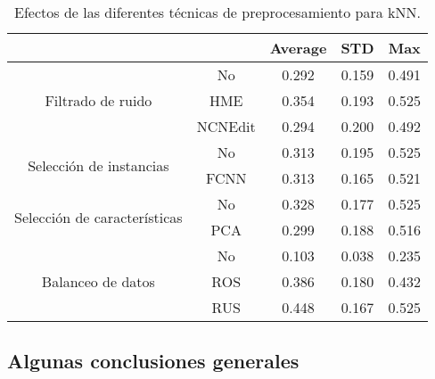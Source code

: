 \begin{table}
    \centering
    \begin{tabular}{cc|c|c|c|}
    \cline{3-5}
    \multicolumn{1}{l}{\textbf{}} & \textbf{} & \multicolumn{1}{c|}{\textbf{Average}} & \multicolumn{1}{c|}{\textbf{STD}} & \textbf{Max} \\ \hline
    \multicolumn{1}{|c|}{\multirow{3}{*}{Filtrado de ruido}}       & No        & 0.292  & 0.159
    & 0.491    \\ \cline{2-5} 
    \multicolumn{1}{|c|}{}  & HME       & 0.354   & 0.193
    & 0.525        \\ \cline{2-5} 
    \multicolumn{1}{|c|}{}  & NCNEdit   & 0.294  & 0.200
    & 0.492        \\ \hline
    \multicolumn{1}{|c|}{\multirow{2}{*}{Selección de instancias}} & No        & 0.313    &  0.195
    & 0.525        \\ \cline{2-5} 
    \multicolumn{1}{|c|}{}  & FCNN      & 0.313   &  0.165
    & 0.521        \\ \hline
    \multicolumn{1}{|c|}{\multirow{2}{*}{Selección de características}} & No        & 0.328    & 0.177
    & 0.525        \\ \cline{2-5} 
    \multicolumn{1}{|c|}{}  & PCA      & 0.299   & 0.188
    & 0.516        \\ \hline
    \multicolumn{1}{|c|}{\multirow{3}{*}{Balanceo de datos}}       & No        & 0.103     &  0.038
    & 0.235        \\ \cline{2-5} 
    \multicolumn{1}{|c|}{}  & ROS       & 0.386  & 0.180
    & 0.432        \\ \cline{2-5} 
    \multicolumn{1}{|c|}{}  & RUS       & 0.448  & 0.167
    & 0.525        \\ \hline
    \end{tabular}
    \caption{Efectos de las diferentes técnicas de preprocesamiento para kNN.}
    \label{knn}
\end{table}

\subsection{Algunas conclusiones generales}


